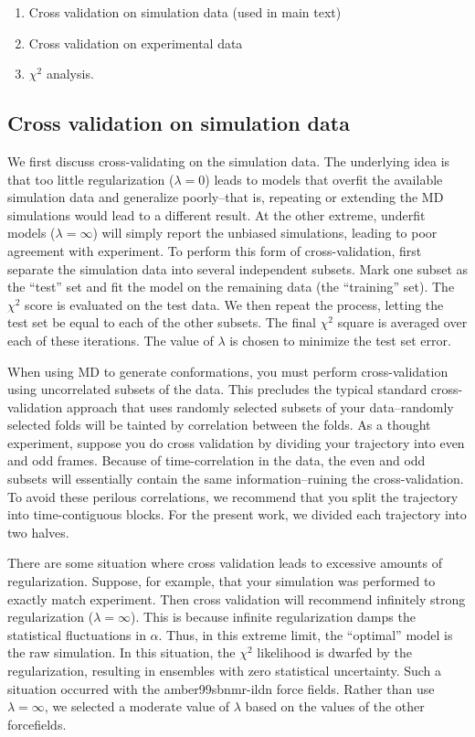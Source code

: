 \documentclass[journal=jacsat,manuscript=article]{achemso}
\begin{document}
\begin{enumerate}
 \item Cross validation on simulation data (used in main text)
 \item Cross validation on experimental data
 \item $\chi^2$ analysis.  
\end{enumerate}

\subsection{Cross validation on simulation data}

We first discuss cross-validating on the simulation data.  The underlying idea is that too little regularization ($\lambda = 0$) leads to models that overfit the available simulation data and generalize poorly--that is, repeating or extending the MD simulations would lead to a different result.  At the other extreme, underfit models ($\lambda = \infty$) will simply report the unbiased simulations, leading to poor agreement with experiment.  To perform this form of cross-validation, first separate the simulation data into several independent subsets.  Mark one subset as the ``test'' set and fit the model on the remaining data (the ``training'' set).  The $\chi^2$ score is evaluated on the test data.  We then repeat the process, letting the test set be equal to each of the other subsets.  The final $\chi^2$ square is averaged over each of these iterations.  The value of $\lambda$ is chosen to minimize the test set error.

When using MD to generate conformations, you must perform cross-validation using uncorrelated subsets of the data.  This precludes the typical standard cross-validation approach that uses randomly selected subsets of your data--randomly selected folds will be tainted by correlation between the folds.  As a thought experiment, suppose you do cross validation by dividing your trajectory into even and odd frames.  Because of time-correlation in the data, the even and odd subsets will essentially contain the same information--ruining the cross-validation.  To avoid these perilous correlations, we recommend that you split the trajectory into time-contiguous blocks.  For the present work, we divided each trajectory into two halves.  

There are some situation where cross validation leads to excessive amounts of regularization.  Suppose, for example, that your simulation was performed to exactly match experiment.  Then cross validation will recommend infinitely strong regularization ($\lambda = \infty$).  This is because infinite regularization damps the statistical fluctuations in $\alpha$.  Thus, in this extreme limit, the ``optimal'' model is the raw simulation.  In this situation, the $\chi^2$ likelihood is dwarfed by the regularization, resulting in ensembles with zero statistical uncertainty.  Such a situation occurred with the amber99sbnmr-ildn force fields.  Rather than use $\lambda = \infty$, we selected a moderate value of $\lambda$ based on the values of the other forcefields.  
\end{document}
